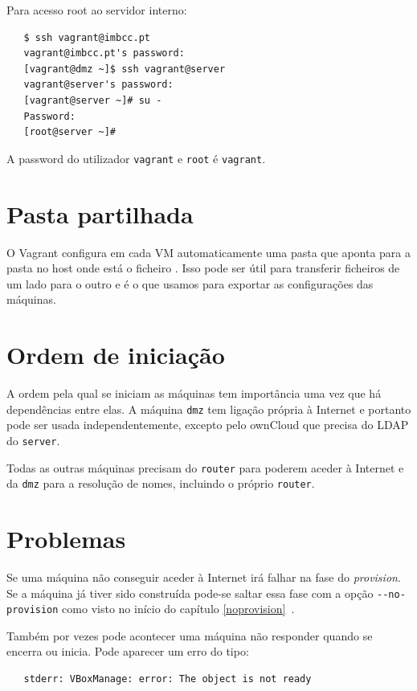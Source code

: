 \documentclass[12pt,a4paper]{report}
\begin{document}
Para acesso root ao servidor interno:

\begin{verbatim}
   $ ssh vagrant@imbcc.pt
   vagrant@imbcc.pt's password: 
   [vagrant@dmz ~]$ ssh vagrant@server
   vagrant@server's password: 
   [vagrant@server ~]# su -
   Password:
   [root@server ~]# 
\end{verbatim}

A password do utilizador \texttt{vagrant} e \texttt{root} é \texttt{vagrant}.

\section{Pasta partilhada}

O Vagrant configura em cada VM automaticamente uma pasta  que aponta para a pasta no host onde está o ficheiro . Isso pode ser útil para transferir ficheiros de um lado para o outro e é o que usamos para exportar as configurações das máquinas.

\section{Ordem de iniciação}

A ordem pela qual se iniciam as máquinas tem importância uma vez que há dependências entre elas. A máquina \texttt{dmz} tem ligação própria à Internet e portanto pode ser usada independentemente, excepto pelo ownCloud que precisa do LDAP do \texttt{server}.

Todas as outras máquinas precisam do \texttt{router} para poderem aceder à Internet e da \texttt{dmz} para a resolução de nomes, incluindo o próprio \texttt{router}.

\section{Problemas}

Se uma máquina não conseguir aceder à Internet irá falhar na fase do \emph{provision}. Se a máquina já tiver sido construída pode-se saltar essa fase com a opção \verb+--no-provision+ como visto no início do capítulo \ref{noprovision}~.

Também por vezes pode acontecer uma máquina não responder quando se encerra ou inicia. Pode aparecer um erro do tipo:

\begin{verbatim}
   stderr: VBoxManage: error: The object is not ready
\end{verbatim}
\end{document}
